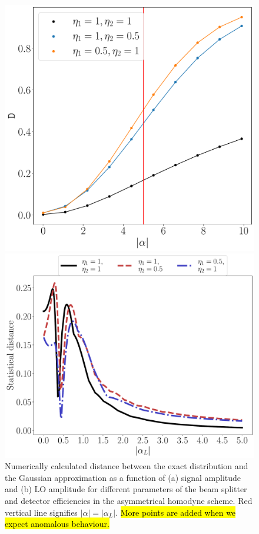 \begin{figure}
    \centering
     \begin{minipage}[c]{.45\linewidth}
 \includegraphics[width=\linewidth]{pics/homodyne/ED = ED(a)_5eta.pdf}
\end{minipage}
\hfill
\begin{minipage}[c]{.45\linewidth}
\includegraphics[width=\linewidth]{pics/homodyne/ED = ED(al).pdf}
        \end{minipage}
    \caption{
    Numerically calculated distance between the exact distribution and the Gaussian approximation as a function of (a) signal amplitude and (b) LO amplitude for different parameters of the beam splitter and detector efficiencies in the asymmetrical homodyne scheme. Red vertical line signifies $|\alpha|=|\alpha_L|$. \hl{More points are added when we expect anomalous behaviour.}
    }\label{fig:amplitude}
\end{figure}

